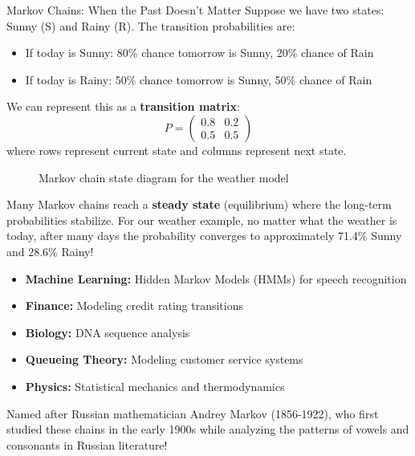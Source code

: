 \begin{funfactsbreak}{Markov Chains: When the Past Doesn't Matter}
Suppose we have two states: Sunny (S) and Rainy (R). The transition probabilities are:
\begin{itemize}
    \item If today is Sunny: 80\% chance tomorrow is Sunny, 20\% chance of Rain
    \item If today is Rainy: 50\% chance tomorrow is Sunny, 50\% chance of Rain
\end{itemize}

We can represent this as a \textbf{transition matrix}:
\[
P = \begin{pmatrix}
0.8 & 0.2 \\
0.5 & 0.5
\end{pmatrix}
\]
where rows represent current state and columns represent next state.

\begin{figure}[H]
    \centering
    \caption{Markov chain state diagram for the weather model}
    \label{fig:markov_weather}
\end{figure}


Many Markov chains reach a \textbf{steady state} (equilibrium) where the long-term probabilities stabilize. For our weather example, no matter what the weather is today, after many days the probability converges to approximately 71.4\% Sunny and 28.6\% Rainy!


\begin{itemize}
    \item \textbf{Machine Learning:} Hidden Markov Models (HMMs) for speech recognition
    \item \textbf{Finance:} Modeling credit rating transitions
    \item \textbf{Biology:} DNA sequence analysis
    \item \textbf{Queueing Theory:} Modeling customer service systems
    \item \textbf{Physics:} Statistical mechanics and thermodynamics
\end{itemize}

Named after Russian mathematician Andrey Markov (1856-1922), who first studied these chains in the early 1900s while analyzing the patterns of vowels and consonants in Russian literature!

\end{funfactsbreak}

